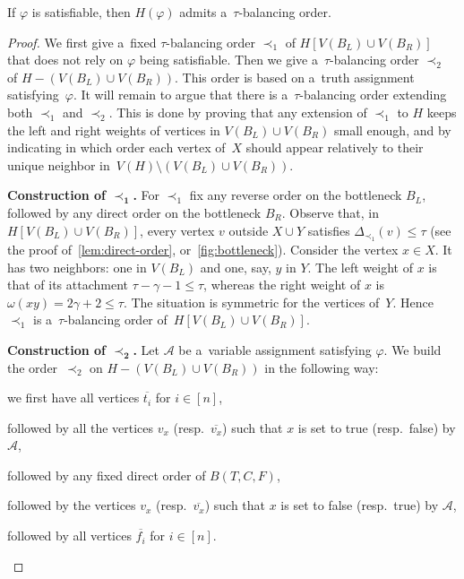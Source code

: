 \documentclass[a4paper,UKenglish,cleveref,hyperref,autoref]{lipics-v2021}
\newcommand{\weight}{\omega}
\begin{document}
\begin{lemma}\label{lem:sat-to-bo}
If $\varphi$ is satisfiable, then $H(\varphi)$ admits a~$\tau$-balancing order.
\end{lemma}
\begin{proof}
We first give a~fixed $\tau$-balancing order $\prec_1$ of $H[V(B_L) \cup V(B_R)]$ that does not rely on $\varphi$ being satisfiable.
Then we give a~$\tau$-balancing order $\prec_2$ of $H - (V(B_L) \cup V(B_R))$.
This order is based on a~truth assignment satisfying~$\varphi$.
It will remain to argue that there is a~$\tau$-balancing order extending both $\prec_1$ and $\prec_2$.
This is done by proving that any extension of $\prec_1$ to $H$ keeps the left and right weights of vertices in $V(B_L) \cup V(B_R)$ small enough, and by indicating in which order each vertex of~$X$ should appear relatively to their unique neighbor in~$V(H) \setminus (V(B_L) \cup V(B_R))$.

\medskip

\textbf{Construction of $\bm{\prec_1}$.}
For $\prec_1$ fix any reverse order on the bottleneck $B_L$, followed by any direct order on the bottleneck $B_R$.
Observe that, in $H[V(B_L) \cup V(B_R)]$, every vertex $v$ outside $X \cup Y$ satisfies $\Delta_{\prec_1}(v) \leqslant \tau$ (see the proof of~\cref{lem:direct-order}, or~\cref{fig:bottleneck}).
Consider the vertex $x \in X$.
It has two neighbors: one in $V(B_L)$ and one, say, $y$ in $Y$.
The left weight of $x$ is that of its attachment $\tau - \gamma - 1 \leqslant \tau$, whereas the right weight of $x$ is $\weight(xy) = 2\gamma + 2 \leqslant \tau$.
The situation is symmetric for the vertices of~$Y$.
Hence $\prec_1$ is a~$\tau$-balancing order of~$H[V(B_L) \cup V(B_R)]$.

\medskip

\textbf{Construction of $\bm{\prec_2}$.}
Let $\mathcal A$ be a~variable assignment satisfying $\varphi$.
We build the order~$\prec_2$ on $H - (V(B_L) \cup V(B_R))$ in the following way:
\begin{compactitem}
	\item we first have all vertices $\overline{t_i}$ for $i \in [n]$,
	\item followed by all the vertices $v_x$ (resp.~$\overline{v_x}$) such that $x$ is set to true (resp.~false) by $\mathcal A$,
	\item followed by any fixed direct order of $B(T, C, F)$,
	\item followed by the vertices $v_x$ (resp.~$\overline{v_x}$) such that $x$ is set to false (resp.~true) by $\mathcal A$,
	\item followed by all vertices $\overline{f_i}$ for $i \in [n]$.
\end{compactitem}


\end{proof}
\end{document}

